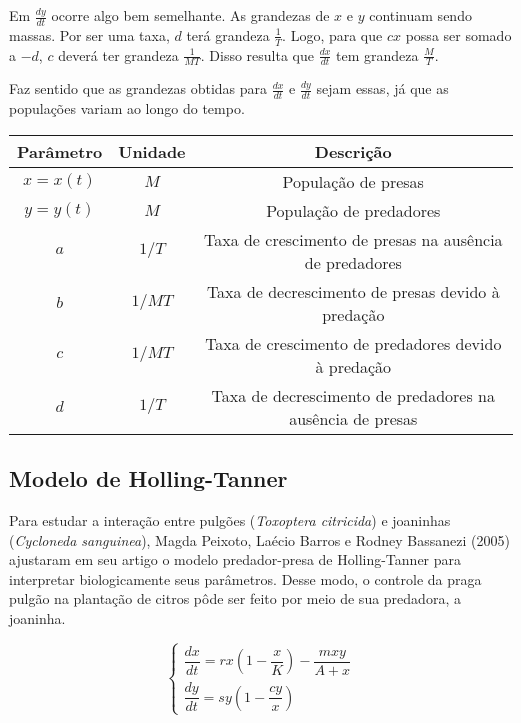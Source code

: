 Em $\frac{dy}{dt}$ ocorre algo bem semelhante. As grandezas de $x$ e $y$ continuam sendo massas. Por ser uma taxa, $d$ terá grandeza $\frac{1}{T}$. Logo, para que $cx$ possa ser somado a $-d$, $c$ deverá ter grandeza $\frac{1}{MT}$. Disso resulta que $\frac{dx}{dt}$ tem grandeza $\frac{M}{T}$.

Faz sentido que as grandezas obtidas para $\frac{dx}{dt}$ e $\frac{dy}{dt}$ sejam essas, já que as populações variam ao longo do tempo.

\begin{center}
\begin{tabular}{| c | c | c |}
\hline
Parâmetro & Unidade & Descrição\\
\hline
$x=x(t)$ & $M$ & População de presas\\
$y=y(t)$ & $M$ & População de predadores\\
$a$ & $1/T$ & Taxa de crescimento de presas na ausência de predadores\\
$b$ & $1/MT$ & Taxa de decrescimento de presas devido à predação\\
$c$ & $1/MT$ & Taxa de crescimento de predadores devido à predação\\
$d$ & $1/T$ & Taxa de decrescimento de predadores na ausência de presas\\
\hline
\end{tabular}
\end{center}

\newpage

\subsection{Modelo de Holling-Tanner}

Para estudar a interação entre pulgões (\textit{Toxoptera citricida}) e joaninhas (\textit{Cycloneda sanguinea}), Magda Peixoto, Laécio Barros e Rodney Bassanezi (2005) \cite{mp_lb_rb_2005} ajustaram em seu artigo o modelo predador-presa de Holling-Tanner para interpretar biologicamente seus parâmetros. Desse modo, o controle da praga pulgão na plantação de citros pôde ser feito por meio de sua predadora, a joaninha.

$$\left\{
\begin{array}{l}
\dfrac{dx}{dt}=rx\left(1-\dfrac{x}{K}\right)-\dfrac{mxy}{A+x}\\
\dfrac{dy}{dt}=sy\left(1-\dfrac{cy}{x}\right)
\end{array}
\right.$$

